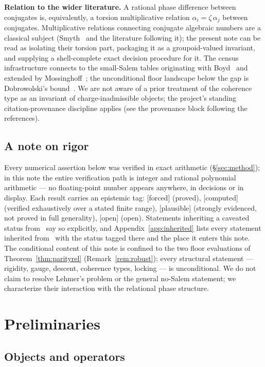 \documentclass[11pt]{article}
\theoremstyle{plain}
\theoremstyle{definition}
\theoremstyle{remark}
\newcommand{\F}{\textnormal{[forced]}}
\newcommand{\C}{\textnormal{[computed]}}
\newcommand{\Pl}{\textnormal{[plausible]}}
\newcommand{\Op}{\textnormal{[open]}}
\begin{document}
\medskip
\noindent\textbf{Relation to the wider literature.} A rational phase
difference between conjugates is, equivalently, a torsion multiplicative
relation $\alpha_i=\zeta\,\alpha_j$ between conjugates. Multiplicative
relations connecting conjugate algebraic numbers are a classical subject
(Smyth~\cite{Smyth1986} and the literature following it); the present note
can be read as isolating their torsion part, packaging it as a
groupoid-valued invariant, and supplying a shell-complete exact decision
procedure for it. The census infrastructure connects to the small-Salem
tables originating with Boyd~\cite{Boyd1977} and extended by
Mossinghoff~\cite{Mossinghoff}; the unconditional floor landscape below the
gap is Dobrowolski's bound~\cite{Dobrowolski}. We are not aware of a prior
treatment of the coherence type as an invariant of charge-inadmissible
objects; the project's standing citation-provenance discipline applies (see
the provenance block following the references).

\subsection{A note on rigor}

Every numerical assertion below was verified in exact arithmetic
(\S\ref{sec:method}); in this note the entire verification path is integer and
rational polynomial arithmetic --- no floating-point number appears anywhere, in
decisions or in display. Each result carries an epistemic tag: \F{} (proved),
\C{} (verified exhaustively over a stated finite range), \Pl{} (strongly
evidenced, not proved in full generality), \Op{} (open). Statements inheriting a
caveated status from~\cite{CMC} say so explicitly, and
Appendix~\ref{app:inherited} lists every statement inherited
from~\cite{CMC} with the status tagged there and the place it enters this
note. The conditional content of this note is confined to the two floor
evaluations of Theorem~\ref{thm:parityrel} (Remark~\ref{rem:robust});
every structural statement --- rigidity, gauge, descent, coherence types,
locking --- is unconditional. We do not claim to resolve
Lehmer's problem or the general no-Salem statement; we characterize their
interaction with the relational phase structure.

\section{Preliminaries}\label{sec:prelim}

\subsection{Objects and operators}
\end{document}
